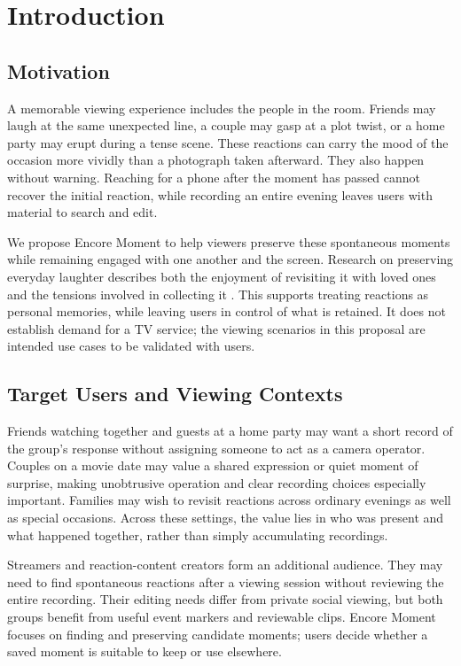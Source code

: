 \section{Introduction}

\subsection{Motivation}

A memorable viewing experience includes the people in the room. Friends may laugh at the same unexpected line, a couple may gasp at a plot twist, or a home party may erupt during a tense scene. These reactions can carry the mood of the occasion more vividly than a photograph taken afterward. They also happen without warning. Reaching for a phone after the moment has passed cannot recover the initial reaction, while recording an entire evening leaves users with material to search and edit.

We propose Encore Moment to help viewers preserve these spontaneous moments while remaining engaged with one another and the screen. Research on preserving everyday laughter describes both the enjoyment of revisiting it with loved ones and the tensions involved in collecting it \cite{ref1}. This supports treating reactions as personal memories, while leaving users in control of what is retained. It does not establish demand for a TV service; the viewing scenarios in this proposal are intended use cases to be validated with users.

\subsection{Target Users and Viewing Contexts}

Friends watching together and guests at a home party may want a short record of the group's response without assigning someone to act as a camera operator. Couples on a movie date may value a shared expression or quiet moment of surprise, making unobtrusive operation and clear recording choices especially important. Families may wish to revisit reactions across ordinary evenings as well as special occasions. Across these settings, the value lies in who was present and what happened together, rather than simply accumulating recordings.

Streamers and reaction-content creators form an additional audience. They may need to find spontaneous reactions after a viewing session without reviewing the entire recording. Their editing needs differ from private social viewing, but both groups benefit from useful event markers and reviewable clips. Encore Moment focuses on finding and preserving candidate moments; users decide whether a saved moment is suitable to keep or use elsewhere.

